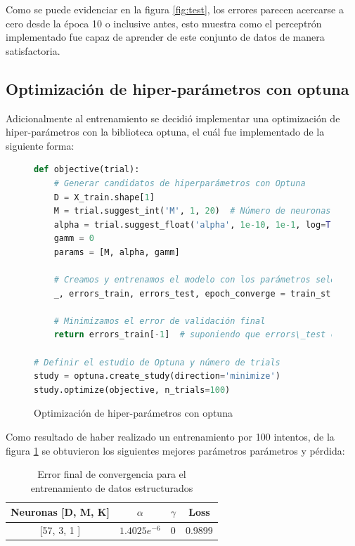 \documentclass{article}
\begin{document}
Como se puede evidenciar en la figura \ref{fig:test}, los errores parecen acercarse a cero desde la época 10 o inclusive antes, esto muestra como el perceptrón implementado fue capaz de aprender de este conjunto de datos de manera satisfactoria.


\subsection{Optimización de hiper-parámetros con optuna}

Adicionalmente al entrenamiento se decidió implementar una optimización de hiper-parámetros con la biblioteca optuna, el cuál fue implementado de la siguiente forma:

\begin{figure}[htbp]
    \centering
    \begin{lstlisting}[language=Python, texcl=True]
def objective(trial):
    # Generar candidatos de hiperparámetros con Optuna
    D = X_train.shape[1]
    M = trial.suggest_int('M', 1, 20)  # Número de neuronas en la capa oculta
    alpha = trial.suggest_float('alpha', 1e-10, 1e-1, log=True)
    gamm = 0
    params = [M, alpha, gamm]

    # Creamos y entrenamos el modelo con los parámetros seleccionados
    _, errors_train, errors_test, epoch_converge = train_structured_data(50, X_train, T_train, X_test, T_test, params, print_e=False)

    # Minimizamos el error de validación final
    return errors_train[-1]  # suponiendo que errors\_test contiene el error de validación en cada época

# Definir el estudio de Optuna y número de trials
study = optuna.create_study(direction='minimize')
study.optimize(objective, n_trials=100)
    \end{lstlisting}
    \caption{Optimización de hiper-parámetros con optuna}
    \label{fig:optuna}
\end{figure}


Como resultado de haber realizado un entrenamiento por 100 intentos, de la figura \ref{fig:optuna} se obtuvieron los siguientes mejores parámetros parámetros y pérdida:

\begin{table}[htbp]
    \centering
    \begin{tabular}{@{}cccc@{}}
    \toprule
    Neuronas {[}D, M, K{]} &  $\alpha$ & $\gamma$ & Loss \\ \midrule
    {[}57, 3, 1 {]} & $1.4025e^{-6}$ & 0 & 0.9899  \\ \bottomrule
    \end{tabular}
    \caption{Error final de convergencia para el entrenamiento de datos estructurados}
    \label{tab:obtuna}
\end{table}
\end{document}
